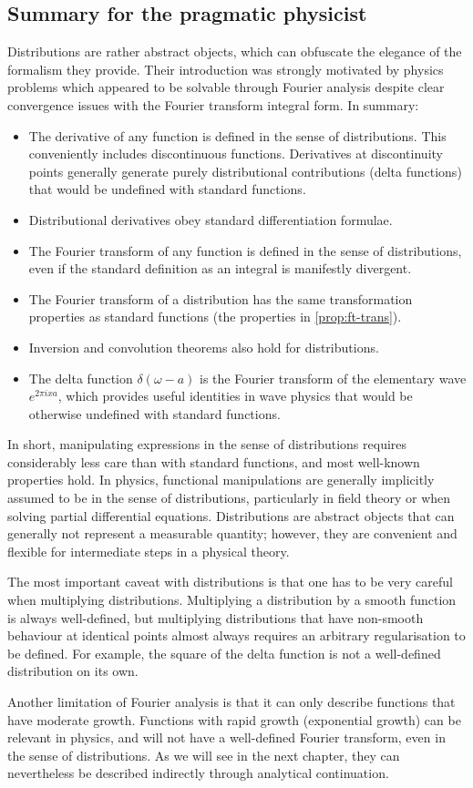 \subsection{Summary for the pragmatic physicist}
Distributions are rather abstract objects, which can obfuscate the elegance of the
formalism they provide. Their introduction was strongly motivated by physics problems
which appeared to be solvable through Fourier analysis despite clear convergence issues
with the Fourier transform integral form. In summary:
\begin{itemize}
	\item The derivative of any function is defined in the sense of distributions. This
	      conveniently includes discontinuous functions. Derivatives at discontinuity points
	      generally generate purely distributional contributions (\eg delta functions) that would
	      be undefined with standard functions.
	\item Distributional derivatives obey standard differentiation formulae.
	\item The Fourier transform of any function is defined in the sense of distributions, even if
	      the standard definition as an integral is manifestly divergent.
	\item The Fourier transform of a distribution has the same transformation properties as
	      standard functions (\ie the properties in \cref{prop:ft-trans}).
	\item Inversion and convolution theorems also hold for distributions.
	\item The delta function $\delta(\omega-a)$ is the Fourier transform of the elementary wave
	      $e^{2\pi i xa}$, which provides useful identities in wave physics that would be otherwise
	      undefined with standard functions.
\end{itemize}
In short, manipulating expressions in the sense of distributions requires considerably
less care than with standard functions, and most well-known properties hold. In physics,
functional manipulations are generally implicitly assumed to be in the sense of
distributions, particularly in field theory or when solving partial differential
equations. Distributions are abstract objects that can generally not represent a measurable
quantity; however, they are convenient and flexible for intermediate steps in a physical
theory.

The most important caveat with distributions is that one has to be very careful when
multiplying distributions. Multiplying a distribution by a smooth function is always
well-defined, but multiplying distributions that have non-smooth behaviour at identical
points almost always requires an arbitrary regularisation to be defined. For example, the
square of the delta function is not a well-defined distribution on its own.

Another limitation of Fourier analysis is that it can only describe functions that have
moderate growth. Functions with rapid growth (\eg exponential growth) can be relevant in
physics, and will not have a well-defined Fourier transform, even in the sense of
distributions. As we will see in the next chapter, they can nevertheless be described
indirectly through analytical continuation.
